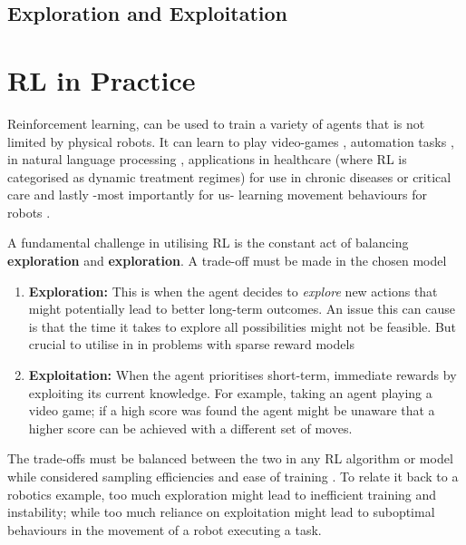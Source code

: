 
    \subsection{Exploration and Exploitation}

\section{RL in Practice}
  Reinforcement learning, can be used to train a variety of agents that is not limited by physical robots. It can learn to play video-games \cite{comi2018} , automation tasks \cite{}, in natural language processing \cite{paulus2017deepreinforcedmodelabstractive}, applications  in healthcare (where RL is categorised as dynamic treatment regimes) for use in chronic diseases or critical care \cite{yu2020reinforcementlearninghealthcaresurvey} and lastly -most importantly for us- learning movement behaviours for robots \cite{}.
  
  A fundamental challenge in utilising RL is the constant act of balancing \textbf{exploration} and \textbf{exploration}. A trade-off must be made in the chosen model 
  \begin{enumerate}
    \item \textbf{Exploration:}
    This is when the agent decides to \emph{explore} new actions that might potentially lead to better long-term outcomes. An issue this can cause is that the time it takes to explore all possibilities might not be feasible. But crucial to utilise in in problems with sparse reward models \cite{}
    \item \textbf{Exploitation:}
    When the agent prioritises short-term, immediate rewards by exploiting its current knowledge. For example, taking an agent playing a video game; if a high score was found the agent might be unaware that a higher score can be achieved with a different set of moves. 
  \end{enumerate}

  The trade-offs must be balanced between the two in any RL algorithm or model while considered sampling efficiencies and ease of training \cite{liu2019simpleexplorationsampleefficient}. To relate it back to a robotics example, too much exploration might lead to inefficient training and instability; while too much reliance on exploitation might lead to suboptimal behaviours in the movement of a robot executing a task. 

